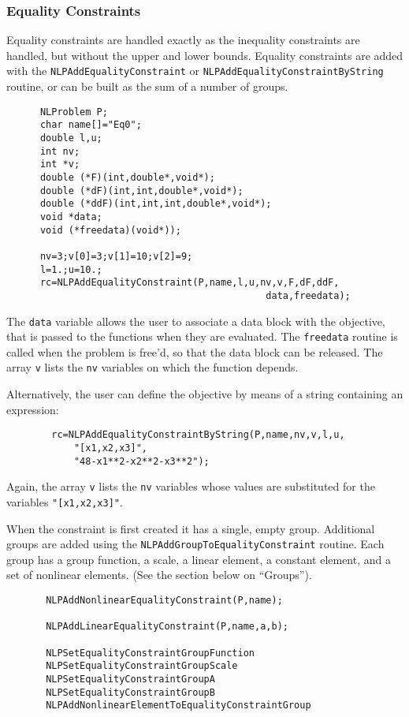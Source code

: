 \documentclass[12pt]{article}
\begin{document}
   \subsubsection{Equality Constraints}
     Equality constraints are handled exactly as the inequality constraints are handled, but without the
     upper and lower bounds. Equality constraints are added with the {\tt NLPAdd\-Equality\-Constraint}
     or {\tt NLPAdd\-Equality\-Constraint\-ByString} routine, or can be built as the sum of a number of groups.
     \begin{verbatim}
      NLProblem P;
      char name[]="Eq0";
      double l,u;
      int nv;
      int *v;
      double (*F)(int,double*,void*);
      double (*dF)(int,int,double*,void*);
      double (*ddF)(int,int,int,double*,void*);
      void *data;
      void (*freedata)(void*));

      nv=3;v[0]=3;v[1]=10;v[2]=9;
      l=1.;u=10.;
      rc=NLPAddEqualityConstraint(P,name,l,u,nv,v,F,dF,ddF,
                                              data,freedata);

     \end{verbatim}
     The {\tt data} variable allows the user to associate a data block with the objective, that is passed to the
     functions when they are evaluated. The {\tt freedata} routine is called when the problem is free'd, so that
     the data block can be released. The array {\tt v} lists the {\tt nv} variables on which the function depends.

     Alternatively, the user can define the objective by means of a string containing an expression:
     \begin{verbatim}
        rc=NLPAddEqualityConstraintByString(P,name,nv,v,l,u,
            "[x1,x2,x3]",
            "48-x1**2-x2**2-x3**2");
     \end{verbatim}
     Again, the array {\tt v} lists the {\tt nv} variables whose values are substituted for the variables
     {\tt "[x1,x2,x3]"}.

     When the constraint is first created it has a single, empty group. Additional groups are added using the
     {\tt NLPAdd\-Group\-To\-Equality\-Constraint} routine. Each group has a group function, a scale, a linear element,
     a constant element, and a set of nonlinear elements. (See the section below on ``Groups'').
     \begin{verbatim}
       NLPAddNonlinearEqualityConstraint(P,name);

       NLPAddLinearEqualityConstraint(P,name,a,b);

       NLPSetEqualityConstraintGroupFunction
       NLPSetEqualityConstraintGroupScale
       NLPSetEqualityConstraintGroupA
       NLPSetEqualityConstraintGroupB
       NLPAddNonlinearElementToEqualityConstraintGroup
     \end{verbatim}
\end{document}
